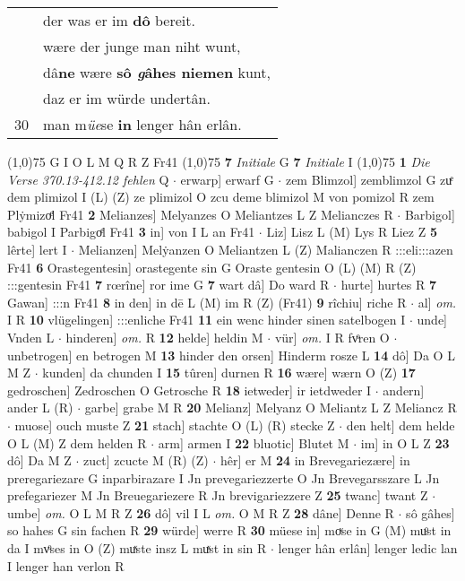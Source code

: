 \documentclass[8pt,a4paper,notitlepage]{article}
\begin{document}
\begin{table}[ht]
\begin{minipage}[t]{0.5\linewidth}
\begin{tabular}{rl}
 & der was er im \textbf{dô} bereit.\\ 
 & wære der junge man niht wunt,\\ 
 & dâ\textbf{ne} wære \textbf{sô \textit{g}âhes niemen} kunt,\\ 
 & daz er im würde undertân.\\ 
30 & man m\textit{üe}se \textbf{in} lenger hân erlân.\\ 
\end{tabular}
\scriptsize
\line(1,0){75} \newline
G I O L M Q R Z Fr41 \newline
\line(1,0){75} \newline
\textbf{7} \textit{Initiale} G  \textbf{7} \textit{Initiale} I  \newline
\line(1,0){75} \newline
\textbf{1} \textit{Die Verse 370.13-412.12 fehlen} Q   $\cdot$ erwarp] erwarf G  $\cdot$ zem Blimzol] zemblimzol G zuͤ dem plimizol I (L) (Z) ze plimizol O zcu deme blimizol M von pomizol R zem Plẏmizoͤl Fr41 \textbf{2} Melianzes] Melyanzes O Meliantzes L Z Melianczes R  $\cdot$ Barbigol] babigol I Parbigoͤl Fr41 \textbf{3} in] von I L an Fr41  $\cdot$ Liz] Lisz L (M) Lys R Liez Z \textbf{5} lêrte] lert I  $\cdot$ Melianzen] Melẏanzen O Meliantzen L (Z) Malianczen R :::eli:::azen Fr41 \textbf{6} Orastegentesin] orastegente sin G Oraste gentesin O (L) (M) R (Z) :::gentesin Fr41 \textbf{7} rœrîne] ror ime G \textbf{7} wart dâ] Do ward R  $\cdot$ hurte] hurtes R \textbf{7} Gawan] :::n Fr41 \textbf{8} in den] in dē L (M) im R (Z) (Fr41) \textbf{9} rîchiu] riche R  $\cdot$ al] \textit{om.} I R \textbf{10} vlügelingen] :::enliche Fr41 \textbf{11} ein wenc hinder sinen satelbogen I  $\cdot$ unde] Vnden L  $\cdot$ hinderen] \textit{om.} R \textbf{12} helde] heldin M  $\cdot$ vür] \textit{om.} I R fvͦren O  $\cdot$ unbetrogen] en betrogen M \textbf{13} hinder den orsen] Hinderm rosze L \textbf{14} dô] Da O L M Z  $\cdot$ kunden] da chunden I \textbf{15} tûren] durnen R \textbf{16} wære] wærn O (Z) \textbf{17} gedroschen] Zedroschen O Getrosche R \textbf{18} ietweder] ir ietdweder I  $\cdot$ andern] ander L (R)  $\cdot$ garbe] grabe M R \textbf{20} Melianz] Melyanz O Meliantz L Z Meliancz R  $\cdot$ muose] ouch muste Z \textbf{21} stach] stachte O (L) (R) stecke Z  $\cdot$ den helt] dem helde O L (M) Z dem helden R  $\cdot$ arm] armen I \textbf{22} bluotic] Blutet M  $\cdot$ im] in O L Z \textbf{23} dô] Da M Z  $\cdot$ zuct] zcucte M (R) (Z)  $\cdot$ hêr] er M \textbf{24} in Brevegariezære] in preregariezare G inparbirazare I Jn prevegariezzerte O Jn Brevegarsszare L Jn prefegariezer M Jn Breuegariezere R Jn brevigariezzere Z \textbf{25} twanc] twant Z  $\cdot$ umbe] \textit{om.} O L M R Z \textbf{26} dô] vil I L \textit{om.} O M R Z \textbf{28} dâne] Denne R  $\cdot$ sô gâhes] so hahes G sin fachen R \textbf{29} würde] werre R \textbf{30} müese in] moͮse in G (M) muͦst in da I mvͦses in O (Z) muͯste insz L muͯst in sin R  $\cdot$ lenger hân erlân] lenger ledic lan I lenger han verlon R \newline

\end{minipage}
\end{table}
\end{document}
